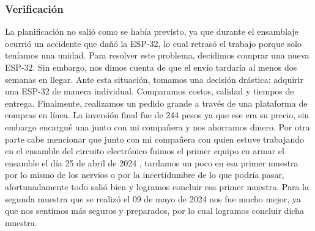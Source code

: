     \subsubsection{Verificación}
    La planificación no salió como se había previsto, ya que durante el ensamblaje ocurrió un accidente que dañó la ESP-32, lo cual retrasó el trabajo porque solo teníamos una unidad. Para resolver este problema, decidimos comprar una nueva ESP-32. Sin embargo, nos dimos cuenta de que el envío tardaría al menos dos semanas en llegar. Ante esta situación, tomamos una decisión drástica: adquirir una ESP-32 de manera individual. Comparamos costos, calidad y tiempos de entrega. Finalmente, realizamos un pedido grande a través de una plataforma de compras en línea. La inversión final fue de 244 pesos ya que ese era su precio, sin embargo encargué una junto con mi compañera y nos ahorramos dinero. Por otra parte cabe mencionar que junto con mi compañera con quien estuve trabajando en el ensamble del circuito electrónico fuimos el primer equipo en armar el ensamble el día 25 de abril de 2024 , tardamos un poco en esa primer muestra por lo mismo de los nervios o por la incertidumbre de lo que podría pasar, afortunadamente todo salió bien y logramos concluir esa primer muestra. Para la segunda muestra que se realizó el 09 de mayo de 2024 nos fue mucho mejor, ya que nos sentimos más seguros y preparados, por lo cual logramos concluir dicha muestra. 
